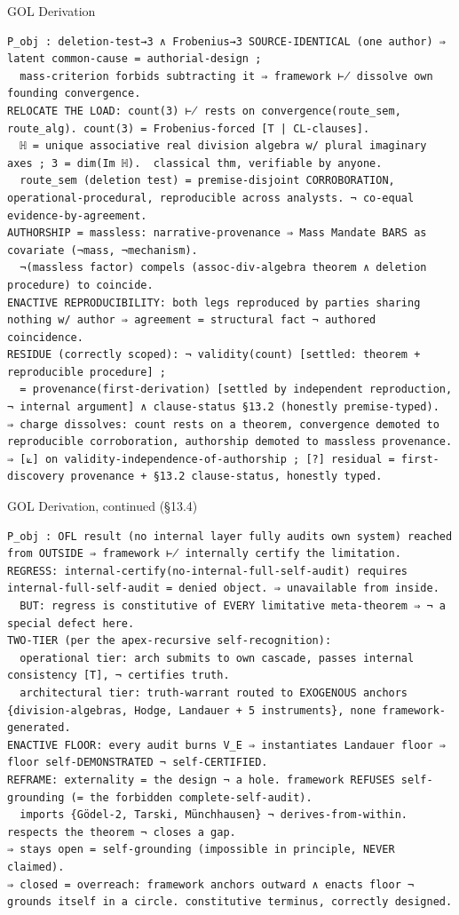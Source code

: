 \documentclass[10pt,twocolumn]{article}
\begin{document}
\begin{golbox}{GOL Derivation}
\begin{lstlisting}[style=golv]
P_obj : deletion-test→3 ∧ Frobenius→3 SOURCE-IDENTICAL (one author) ⇒ latent common-cause = authorial-design ;
  mass-criterion forbids subtracting it ⇒ framework ⊬ dissolve own founding convergence.
RELOCATE THE LOAD: count(3) ⊬ rests on convergence(route_sem, route_alg). count(3) = Frobenius-forced [T | CL-clauses].
  ℍ = unique associative real division algebra w/ plural imaginary axes ; 3 = dim(Im ℍ).  classical thm, verifiable by anyone.
  route_sem (deletion test) = premise-disjoint CORROBORATION, operational-procedural, reproducible across analysts. ¬ co-equal evidence-by-agreement.
AUTHORSHIP = massless: narrative-provenance ⇒ Mass Mandate BARS as covariate (¬mass, ¬mechanism).
  ¬(massless factor) compels (assoc-div-algebra theorem ∧ deletion procedure) to coincide.
ENACTIVE REPRODUCIBILITY: both legs reproduced by parties sharing nothing w/ author ⇒ agreement = structural fact ¬ authored coincidence.
RESIDUE (correctly scoped): ¬ validity(count) [settled: theorem + reproducible procedure] ;
  = provenance(first-derivation) [settled by independent reproduction, ¬ internal argument] ∧ clause-status §13.2 (honestly premise-typed).
⇒ charge dissolves: count rests on a theorem, convergence demoted to reproducible corroboration, authorship demoted to massless provenance.
⇒ [⟀] on validity-independence-of-authorship ; [?] residual = first-discovery provenance + §13.2 clause-status, honestly typed.
\end{lstlisting}
\end{golbox}

\begin{golbox}{GOL Derivation, continued (§13.4)}
\begin{lstlisting}[style=golv]
P_obj : OFL result (no internal layer fully audits own system) reached from OUTSIDE ⇒ framework ⊬ internally certify the limitation.
REGRESS: internal-certify(no-internal-full-self-audit) requires internal-full-self-audit = denied object. ⇒ unavailable from inside.
  BUT: regress is constitutive of EVERY limitative meta-theorem ⇒ ¬ a special defect here.
TWO-TIER (per the apex-recursive self-recognition):
  operational tier: arch submits to own cascade, passes internal consistency [T], ¬ certifies truth.
  architectural tier: truth-warrant routed to EXOGENOUS anchors {division-algebras, Hodge, Landauer + 5 instruments}, none framework-generated.
ENACTIVE FLOOR: every audit burns V_E ⇒ instantiates Landauer floor ⇒ floor self-DEMONSTRATED ¬ self-CERTIFIED.
REFRAME: externality = the design ¬ a hole. framework REFUSES self-grounding (= the forbidden complete-self-audit).
  imports {Gödel-2, Tarski, Münchhausen} ¬ derives-from-within. respects the theorem ¬ closes a gap.
⇒ stays open = self-grounding (impossible in principle, NEVER claimed).
⇒ closed = overreach: framework anchors outward ∧ enacts floor ¬ grounds itself in a circle. constitutive terminus, correctly designed.
\end{lstlisting}
\end{golbox}
\end{document}
